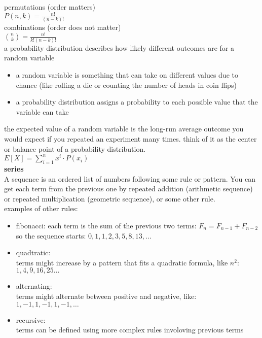\documentclass{article}
\begin{document}
permutations (order matters)\\
$P(n, k) = \frac{n!}{(n - k)!}$\\

combinations (order does not matter)\\
$\binom{n}{k} = \frac{n!}{k!(n - k)!}$\\

a probability distribution describes how likely different outcomes are for a random variable
	\begin{itemize}
		\item a random variable is something that can take on different values due to chance (like rolling a die or counting the number of heads in coin flips)
		\item a probability distribution assigns a probability to each possible value that the variable can take
	\end{itemize}

the expected value of a random variable is the long-run average outcome you would expect if you repeated an experiment many times. think of it as the center or balance point of a probability distribution.\\

$E[X] = \sum_{i=1}^{n} x^i \cdot P(x_i)$\\

\textbf{series}\\

A sequence is an ordered list of numbers following some rule or pattern. You can get each term from the previous one by repeated addition (arithmetic sequence) or repeated multiplication (geometric sequence), or some other rule.\\

examples of other rules:
	\begin{itemize}
		\item fibonacci: 
			each term is the sum of the previous two terms: $F_n = F_{n - 1} + F_{n - 2}$\\
			so the sequence starts: $0, 1, 1, 2, 3, 5, 8, 13, \ldots$
		\item quadtratic:\\
			terms might increase by a pattern that fits a quadratic formula, like $n^2$:\\
			$1, 4, 9, 16, 25 \ldots$
		\item alternating:\\
			terms might alternate between positive and negative, like:\\
			$1, -1, 1, -1, 1, -1, \ldots$
		\item recursive:\\
			terms can be defined using more complex rules involoving previous terms
	\end{itemize}
\end{document}
